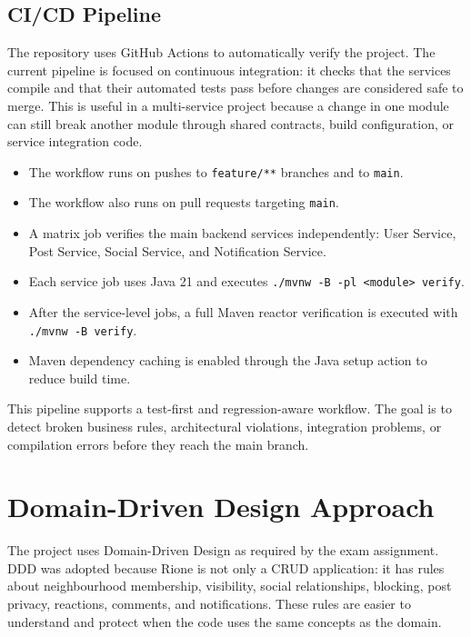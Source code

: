 \documentclass[12pt,a4paper]{article}
\begin{document}
\subsection{CI/CD Pipeline}

The repository uses GitHub Actions to automatically verify the project. The current pipeline is focused on continuous integration: it checks that the services compile and that their automated tests pass before changes are considered safe to merge. This is useful in a multi-service project because a change in one module can still break another module through shared contracts, build configuration, or service integration code.

\begin{itemize}
    \item The workflow runs on pushes to \texttt{feature/**} branches and to \texttt{main}.
    \item The workflow also runs on pull requests targeting \texttt{main}.
    \item A matrix job verifies the main backend services independently: User Service, Post Service, Social Service, and Notification Service.
    \item Each service job uses Java 21 and executes \texttt{./mvnw -B -pl <module> verify}.
    \item After the service-level jobs, a full Maven reactor verification is executed with \texttt{./mvnw -B verify}.
    \item Maven dependency caching is enabled through the Java setup action to reduce build time.
\end{itemize}

This pipeline supports a test-first and regression-aware workflow. The goal is to detect broken business rules, architectural violations, integration problems, or compilation errors before they reach the main branch.

\section{Domain-Driven Design Approach}
The project uses Domain-Driven Design as required by the exam assignment. DDD was adopted because Rione is not only a CRUD application: it has rules about neighbourhood membership, visibility, social relationships, blocking, post privacy, reactions, comments, and notifications. These rules are easier to understand and protect when the code uses the same concepts as the domain.
\end{document}
